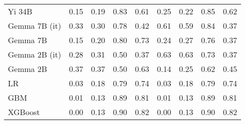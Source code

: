 \begin{tabular}{lllllllll}
Yi 34B & 0.15 & 0.19 & \cellcolor{cyan!17.7} 0.83 & 0.61 & 0.25 & \cellcolor{cyan!2.5} 0.22 & \cellcolor{cyan!13.3} 0.85 & 0.62 \\
Gemma 7B (it) & 0.33 & 0.30 & 0.78 & 0.42 & \cellcolor{orange!14.7} 0.61 & \cellcolor{orange!4.7} 0.59 & \cellcolor{cyan!3.8} 0.84 & \cellcolor{orange!25.0} 0.37 \\
Gemma 7B & 0.15 & 0.20 & 0.80 & 0.73 & 0.24 & 0.27 & 0.76 & \cellcolor{orange!25.0} 0.37 \\
Gemma 2B (it) & 0.28 & 0.31 & \cellcolor{orange!25.0} 0.50 & \cellcolor{orange!25.0} 0.37 & \cellcolor{orange!25.0} 0.63 & \cellcolor{orange!25.0} 0.63 & 0.73 & \cellcolor{orange!25.0} 0.37 \\
Gemma 2B & \cellcolor{orange!25.0} 0.37 & \cellcolor{orange!25.0} 0.37 & \cellcolor{orange!25.0} 0.50 & 0.63 & \cellcolor{cyan!25.0} 0.14 & 0.25 & \cellcolor{orange!25.0} 0.62 & 0.45 \\
LR & 0.03 & 0.18 & 0.79 & 0.74 & 0.03 & 0.18 & 0.79 & 0.74 \\
GBM & 0.01 & 0.13 & 0.89 & 0.81 & 0.01 & 0.13 & 0.89 & 0.81 \\
XGBoost & 0.00 & 0.13 & 0.90 & 0.82 & 0.00 & 0.13 & 0.90 & 0.82 \\
\bottomrule
\end{tabular}


